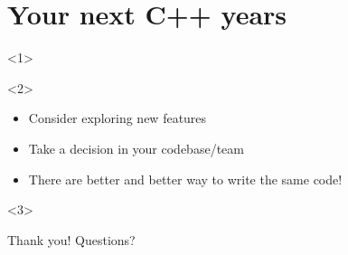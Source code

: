 \documentclass[usenames,dvipsnames,svgnames,14pt]{beamer}
\begin{document}
    \part{Your next C++ years}
    \begin{frame}{}
        \begin{onlyenv}<1>
        \end{onlyenv}
        \vspace{5mm}
        \begin{overlayarea}{\textwidth}{0.23\textheight}
            \begin{onlyenv}<2>
                \begin{itemize}
                    \item Consider exploring new features
                    \item Take a decision in your codebase/team
                    \item There are better and better way to write the same code!
                \end{itemize}
            \end{onlyenv}
            \begin{onlyenv}<3>
                \begin{center}
                    \LARGE Thank you! Questions?

\end{center}
\end{onlyenv}
\end{overlayarea}
\end{frame}
\end{document}
